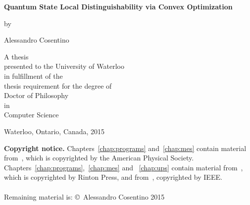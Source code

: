 %
\pagestyle{empty}

\begin{titlepage}
        \begin{center}
        \vspace*{1.0cm}

        \Huge
        {\bf Quantum State Local Distinguishability via Convex Optimization}

        \vspace*{1.0cm}

        \normalsize
        by \\

        \vspace*{1.0cm}

        \Large
        Alessandro Cosentino \\

        \vspace*{3.0cm}

        \normalsize
        A thesis \\
        presented to the University of Waterloo \\ 
        in fulfillment of the \\
        thesis requirement for the degree of \\
        Doctor of Philosophy \\
        in \\
        Computer Science \\

        \vspace*{2.0cm}

        Waterloo, Ontario, Canada, 2015 \\

        \vspace*{1.0cm}

        \end{center}
\end{titlepage}

\noindent\textbf{Copyright notice.}
Chapters~\ref{chap:programs} and~\ref{chap:mes} contain material 
from~\cite{Cosentino13}, which is copyrighted by the American Physical Society.
Chapters~\ref{chap:programs},~\ref{chap:mes} and ~\ref{chap:ups}
contain material from~\cite{Cosentino14}, which is copyrighted by Rinton Press, 
and from~\cite{Bandyopadhyay15}, copyrighted by IEEE.
\\ \\
Remaining material is:
\copyright\ Alessandro Cosentino 2015 \\


